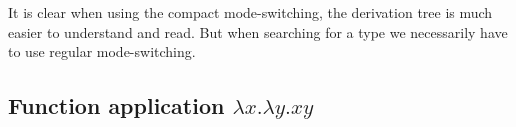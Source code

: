 \begin{example}
\begin{prooftree}
        
        
        
    \end{prooftree}
\end{example}
     It is clear when using the compact mode-switching, the derivation tree is much easier to understand and read. But when searching for a type we necessarily have to use regular mode-switching.
     

\subsection{Function application \texorpdfstring{$\lambda x . \lambda y . x y$}{}}


